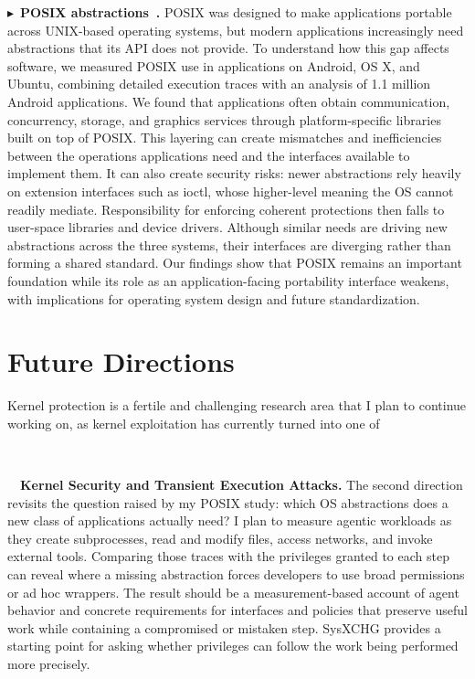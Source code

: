 \documentclass[10pt,letterpaper]{article}
\newcommand{\project}[2]{\par\Needspace{6\baselineskip}\noindent
  $\blacktriangleright$~\textbf{#1~\cite{#2}.}}
\begin{document}
\project{POSIX abstractions}{posix}
POSIX was designed to make applications portable across UNIX-based operating
systems, but modern applications increasingly need abstractions that its API
does not provide. To understand how this gap affects software, we measured
POSIX use in applications on Android, OS X, and Ubuntu, combining detailed
execution traces with an analysis of 1.1 million Android applications. We found
that applications often obtain communication, concurrency, storage, and graphics
services through platform-specific libraries built on top of POSIX. This
layering can create mismatches and inefficiencies between the operations
applications need and the interfaces available to implement them. It can also
create security risks: newer abstractions rely heavily on extension interfaces
such as ioctl, whose higher-level meaning the OS cannot readily mediate.
Responsibility for enforcing coherent protections then falls to user-space
libraries and device drivers. Although similar needs are driving new
abstractions across the three systems, their interfaces are diverging rather
than forming a shared standard. Our findings show that POSIX remains an
important foundation while its role as an application-facing portability
interface weakens, with implications for operating system design and future
standardization.



\section{Future Directions}
Kernel protection is a fertile and challenging research area that I plan to
continue working on, as kernel exploitation has currently turned into one of

\
\vspace{-0.75em}

{\noindent~~\textbf{Kernel Security and Transient Execution Attacks.}}
The second direction revisits the question raised by my POSIX study: which OS
abstractions does a new class of applications actually need? I plan to measure
agentic workloads as they create subprocesses, read and modify files, access
networks, and invoke external tools. Comparing those traces with the privileges
granted to each step can reveal where a missing abstraction forces developers
to use broad permissions or ad hoc wrappers. The result should be a
measurement-based account of agent behavior and concrete requirements for
interfaces and policies that preserve useful work while containing a
compromised or mistaken step. SysXCHG provides a starting point for asking
whether privileges can follow the work being performed more precisely.
\end{document}
